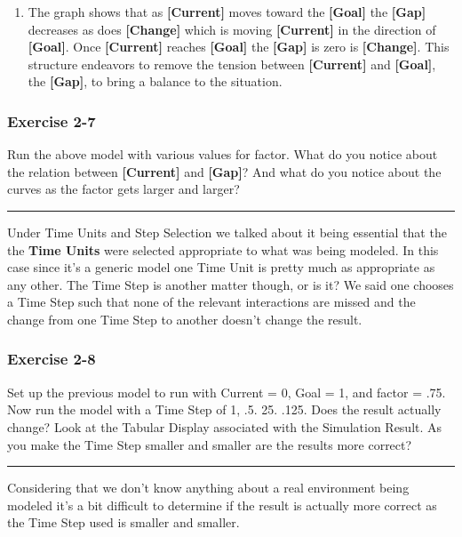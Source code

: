 \documentclass[]{memoir}
\newcommand{\p}[1]{\textbf{{[}#1{]}}}
\renewcommand{\u}[1]{\textbf{#1}}
\begin{document}
\begin{oframed}
\begin{enumerate}
\item 

The graph shows that as \p{Current} moves toward the \p{Goal} the \p{Gap} decreases as does \p{Change} which is moving \p{Current} in the direction of \p{Goal}. Once \p{Current} reaches \p{Goal} the \p{Gap} is zero is \p{Change}. This structure endeavors to remove the tension between \p{Current} and \p{Goal}, the \p{Gap}, to bring a balance to the situation.



\end{enumerate} \end{oframed}

\subsubsection{Exercise 2-7}

Run the above model with various values for factor. What do you notice
about the relation between \p{Current} and \p{Gap}? And what do you
notice about the curves as the factor gets larger and larger?

\begin{center}\rule{3in}{0.4pt}\end{center}

Under Time Units and Step Selection we talked about it being essential
that the the \u{Time Units} were selected appropriate to what was being
modeled. In this case since it's a generic model one Time Unit is pretty
much as appropriate as any other. The Time Step is another matter
though, or is it? We said one chooses a Time Step such that none of the
relevant interactions are missed and the change from one Time Step to
another doesn't change the result.

\subsubsection{Exercise 2-8}

Set up the previous model to run with Current = 0, Goal = 1, and factor
= .75. Now run the model with a Time Step of 1, .5. 25. .125. Does the
result actually change? Look at the Tabular Display associated with the
Simulation Result. As you make the Time Step smaller and smaller are the
results more correct?

\begin{center}\rule{3in}{0.4pt}\end{center}

Considering that we don't know anything about a real environment being
modeled it's a bit difficult to determine if the result is actually more
correct as the Time Step used is smaller and smaller.
\end{document}
